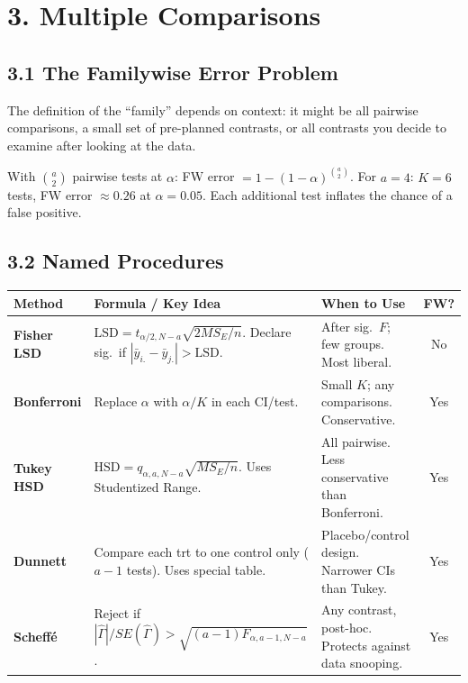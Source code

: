 \documentclass[9pt,letterpaper]{article}
\begin{document}
\section{3. Multiple Comparisons}

\subsection{3.1 The Familywise Error Problem}
The definition of the ``family'' depends on context: it might be all pairwise comparisons, a small set of pre-planned contrasts, or all contrasts you decide to examine after looking at the data.

With $\binom{a}{2}$ pairwise tests at $\alpha$: FW error $= 1-(1-\alpha)^{\binom{a}{2}}$. For $a=4$: $K=6$ tests, FW error $\approx 0.26$ at $\alpha=0.05$. Each additional test inflates the chance of a false positive. 

\subsection{3.2 Named Procedures}

\begin{center}\small
\begin{tabular}{@{}p{1.6cm}p{4.8cm}p{3.8cm}c@{}}
\toprule
\textbf{Method} & \textbf{Formula / Key Idea} & \textbf{When to Use} & \textbf{FW?} \\
\midrule
\textbf{Fisher LSD} & $\text{LSD}=t_{\alpha/2,N-a}\sqrt{2 MS_E/n}$. Declare sig.\ if $|\bar{y}_{i.}-\bar{y}_{j.}|>\text{LSD}$. & After sig.\ $F$; few groups. Most liberal. & No \\[4pt]
\textbf{Bonferroni} & Replace $\alpha$ with $\alpha/K$ in each CI/test. & Small $K$; any comparisons. Conservative. & Yes \\[4pt]
\textbf{Tukey HSD} & $\text{HSD}=q_{\alpha,a,N-a}\sqrt{MS_E/n}$. Uses Studentized Range. & All pairwise. Less conservative than Bonferroni. & Yes \\[4pt]
\textbf{Dunnett} & Compare each trt to one control only ($a-1$ tests). Uses special table. & Placebo/control design. Narrower CIs than Tukey. & Yes \\[4pt]
\textbf{Scheff\'e} & Reject if $|\hat\Gamma|/SE(\hat\Gamma) > \sqrt{(a-1)F_{\alpha,a-1,N-a}}$. & Any contrast, post-hoc. Protects against data snooping. & Yes \\
\bottomrule
\end{tabular}
\end{center}
\end{document}
